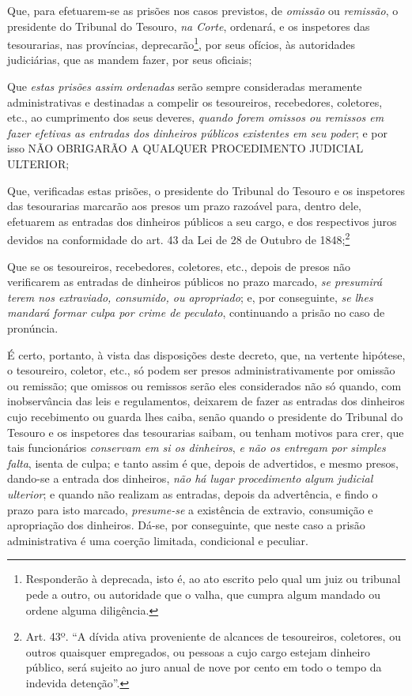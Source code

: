 Que, para efetuarem-se as prisões nos casos previstos, de \emph{omissão}
ou \emph{remissão}, o presidente do Tribunal do Tesouro, \emph{na
Corte}, ordenará, e os inspetores das tesourarias, nas províncias,
deprecarão\footnote{Responderão à deprecada, isto é, ao ato escrito pelo
  qual um juiz ou tribunal pede a outro, ou autoridade que o valha, que
  cumpra algum mandado ou ordene alguma diligência.}, por seus ofícios,
às autoridades judiciárias, que as mandem fazer, por seus oficiais;

Que \emph{estas prisões assim ordenadas} serão sempre consideradas
meramente administrativas e destinadas a compelir os tesoureiros,
recebedores, coletores, etc., ao cumprimento dos seus deveres,
\emph{quando forem omissos ou remissos em fazer efetivas as entradas dos
dinheiros públicos existentes em seu poder}; e por isso NÃO OBRIGARÃO A
QUALQUER PROCEDIMENTO JUDICIAL ULTERIOR;

Que, verificadas estas prisões, o presidente do Tribunal do Tesouro e os
inspetores das tesourarias marcarão aos presos um prazo razoável para,
dentro dele, efetuarem as entradas dos dinheiros públicos a seu cargo, e
dos respectivos juros devidos na conformidade do art. 43 da Lei de 28 de
Outubro de 1848;\footnote{Art. 43º. ``A dívida ativa proveniente de
  alcances de tesoureiros, coletores, ou outros quaisquer empregados, ou
  pessoas a cujo cargo estejam dinheiro público, será sujeito ao juro
  anual de nove por cento em todo o tempo da indevida detenção''.}

Que se os tesoureiros, recebedores, coletores, etc., depois de presos
não verificarem as entradas de dinheiros públicos no prazo marcado,
\emph{se presumirá terem nos extraviado, consumido, ou apropriado}; e,
por conseguinte, \emph{se lhes mandará formar culpa por crime de
peculato}, continuando a prisão no caso de pronúncia.

É certo, portanto, à vista das disposições deste decreto, que, na
vertente hipótese, o tesoureiro, coletor, etc., só podem ser presos
administrativamente por omissão ou remissão; que omissos ou remissos
serão eles considerados não só quando, com inobservância das leis e
regulamentos, deixarem de fazer as entradas dos dinheiros cujo
recebimento ou guarda lhes caiba, senão quando o presidente do Tribunal
do Tesouro e os inspetores das tesourarias saibam, ou tenham motivos
para crer, que tais funcionários \emph{conservam em si os dinheiros},
\emph{e não os entregam por simples falta}, isenta de culpa; e tanto
assim é que, depois de advertidos, e mesmo presos, dando-se a entrada
dos dinheiros, \emph{não há lugar procedimento algum judicial ulterior};
e quando não realizam as entradas, depois da advertência, e findo o
prazo para isto marcado, \emph{presume-se} a existência de extravio,
consumição e apropriação dos dinheiros. Dá-se, por conseguinte, que
neste caso a prisão administrativa é uma coerção limitada, condicional e
peculiar.


